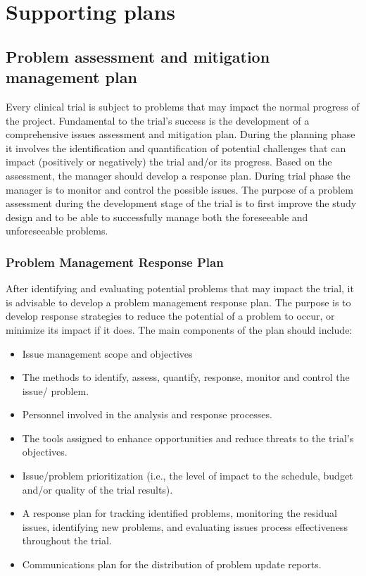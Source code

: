 \documentclass[]{book}
\providecommand{\tightlist}{%
  \setlength{\itemsep}{0pt}\setlength{\parskip}{0pt}}
\theoremstyle{definition}
\theoremstyle{definition}
\theoremstyle{definition}
\theoremstyle{remark}
\begin{document}
\section{Supporting plans}\label{supporting-plans}

\subsection{Problem assessment and mitigation management
plan}\label{problem-assessment-and-mitigation-management-plan}

Every clinical trial is subject to problems that may impact the normal
progress of the project. Fundamental to the trial's success is the
development of a comprehensive issues assessment and mitigation plan.
During the planning phase it involves the identification and
quantification of potential challenges that can impact (positively or
negatively) the trial and/or its progress. Based on the assessment, the
manager should develop a response plan. During trial phase the manager
is to monitor and control the possible issues. The purpose of a problem
assessment during the development stage of the trial is to first improve
the study design and to be able to successfully manage both the
foreseeable and unforeseeable problems.

\subsubsection{Problem Management Response
Plan}\label{problem-management-response-plan}

After identifying and evaluating potential problems that may impact the
trial, it is advisable to develop a problem management response plan.
The purpose is to develop response strategies to reduce the potential of
a problem to occur, or minimize its impact if it does. The main
components of the plan should include:

\begin{itemize}
\tightlist
\item
  Issue management scope and objectives
\item
  The methods to identify, assess, quantify, response, monitor and
  control the issue/ problem.
\item
  Personnel involved in the analysis and response processes.
\item
  The tools assigned to enhance opportunities and reduce threats to the
  trial's objectives.
\item
  Issue/problem prioritization (i.e., the level of impact to the
  schedule, budget and/or quality of the trial results).
\item
  A response plan for tracking identified problems, monitoring the
  residual issues, identifying new problems, and evaluating issues
  process effectiveness throughout the trial.
\item
  Communications plan for the distribution of problem update reports.
\end{itemize}
\end{document}
